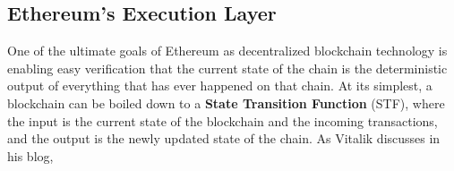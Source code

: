 \documentclass[12pt]{article}
\begin{document}

\subsection[\protect\textbf{\small Ethereum's Execution Layer}]{Ethereum's Execution Layer}
\label{Execution Layer}

One of the ultimate goals of Ethereum as decentralized blockchain technology is enabling easy verification that the current state of the chain is the deterministic output of everything that has ever happened on that chain. At its simplest, a blockchain can be boiled down to a \textbf{State Transition Function} (STF), where the input is the current state of the blockchain and the incoming transactions, and the output is the newly updated state of the chain. As Vitalik discusses in his blog, 
\end{document}
